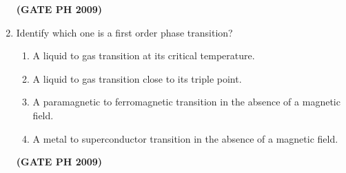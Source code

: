 \documentclass[14pt, a4paper]{extarticle}
\begin{document}
\begin{enumerate}[label=\textbf{Q. \arabic*}]
\begin{enumerate}
\end{enumerate}
\hfill \textbf{(GATE PH 2009)}

\item Identify which one is a first order phase transition?
    \begin{enumerate}
        \item A liquid to gas transition at its critical temperature.
        \item A liquid to gas transition close to its triple point.
        \item A paramagnetic to ferromagnetic transition in the absence of a magnetic field.
        \item A metal to superconductor transition in the absence of a magnetic field.
    \end{enumerate}
    \hfill \textbf{(GATE PH 2009)}


\end{enumerate}
\end{document}
